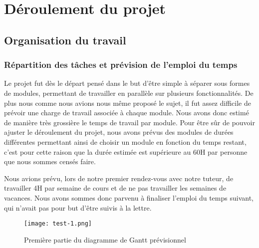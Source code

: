 \graphicspath{{Others/}}

\section{Déroulement du projet}
\subsection{Organisation du travail}
\subsubsection{Répartition des tâches et prévision de l'emploi du temps}
Le projet fut dès le départ pensé dans le but d'être simple à séparer sous formes de modules, permettant de travailler en parallèle sur plusieurs fonctionnalités.
De plus nous comme nous avions nous même proposé le sujet, il fut assez difficile de prévoir une charge de travail associée à chaque module. Nous avons donc estimé 
de manière très grossière le temps de travail par module. Pour être sûr de pouvoir ajuster le déroulement du projet, nous avons prévus des modules de durées différentes permettant ainsi
de choisir un module en fonction du temps restant, c'est pour cette raison que la durée estimée est supérieure au 60H par personne que nous sommes censés faire.
\par
Nous avions prévu, lors de notre premier rendez-vous avec notre tuteur, de travailler 4H par semaine de cours et de ne pas travailler les semaines de vacances.
Nous avons sommes donc parvenu à finaliser l'emploi du temps suivant, qui n'avait pas pour but d'être suivis à la lettre.
\vfill
\begin{figure}[!h]
    \begin{center}
        \texttt{[image: test-1.png]}
        \caption{Première partie du diagramme de Gantt prévisionnel}
    \end{center}
\end{figure}
